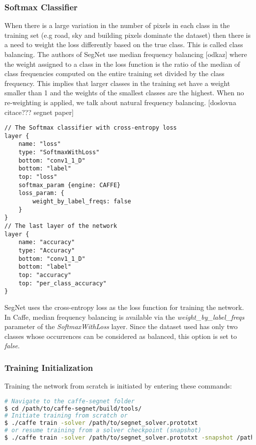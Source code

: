 \subsubsection{Softmax Classifier}

When there is a large variation in the number of pixels in each class in the training set (e.g road, sky and building pixels dominate the dataset) then there is a need to weight the loss differently based on the true class. This is called class balancing. The authors of SegNet use median frequency balancing [odkaz] where the weight assigned to a class in the loss function is the ratio of the median of class frequencies computed on the entire training set divided by the class frequency. This implies that larger classes in the training set have a weight smaller than 1 and the weights of the smallest classes are the highest. When no re-weighting is applied, we talk about natural frequency balancing. [doslovna citace??? segnet paper]

\begin{lstlisting}
// The Softmax classifier with cross-entropy loss
layer {
	name: "loss"
	type: "SoftmaxWithLoss"
	bottom: "conv1_1_D"
	bottom: "label"
	top: "loss"
	softmax_param {engine: CAFFE}
	loss_param: {
		weight_by_label_freqs: false	     
	}
}
// The last layer of the network
layer {
	name: "accuracy"
	type: "Accuracy"
	bottom: "conv1_1_D"
	bottom: "label"
	top: "accuracy"
	top: "per_class_accuracy"
}
\end{lstlisting}


SegNet uses the cross-entropy loss as the loss function for training the network. In Caffe, median frequency balancing is available via the \textit{weight\_by\_label\_freqs} parameter of the \textit{SoftmaxWithLoss} layer. Since the dataset used has only two classes whose occurrences can be considered as balanced, this option is set to \textit{false}. 

\subsubsection{Training Initialization}

\noindent Training the network from scratch is initiated by entering these commands:

\begin{lstlisting}[language=bash]
# Navigate to the caffe-segnet folder
$ cd /path/to/caffe-segnet/build/tools/
# Initiate training from scratch or
$ ./caffe train -solver /path/to/segnet_solver.prototxt
# or resume training from a solver checkpoint (snapshot)
$ ./caffe train -solver /path/to/segnet_solver.prototxt -snapshot /path/to/snapshot_iter_XY.solverstate
\end{lstlisting}

